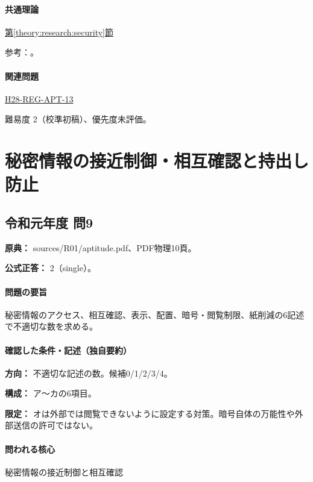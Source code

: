 \paragraph{共通理論} \hyperref[theory:research:security]{第\ref*{theory:research:security}節}

\par 参考：\cite{saf53_ipa_mail}。

\paragraph{関連問題} \hyperref[q:h28-reg-apt-13]{H28-REG-APT-13}

\par 難易度 2（校準初稿）、優先度未評価。

\section{秘密情報の接近制御・相互確認と持出し防止}

\subsection{令和元年度 問9}
\label{q:r01-reg-apt-09}

\noindent\textbf{原典：} sources/R01/aptitude.pdf、PDF物理10頁。

\textbf{公式正答：} 2（single）。

\paragraph{問題の要旨} 秘密情報のアクセス、相互確認、表示、配置、暗号・閲覧制限、紙削減の6記述で不適切な数を求める。

\paragraph{確認した条件・記述（独自要約）}\mbox{}\par

\noindent\textbf{方向：} 不適切な記述の数。候補0/1/2/3/4。\par

\noindent\textbf{構成：} ア〜カの6項目。\par

\noindent\textbf{限定：} オは外部では閲覧できないように設定する対策。暗号自体の万能性や外部送信の許可ではない。\par

\paragraph{問われる核心} 秘密情報の接近制御と相互確認

